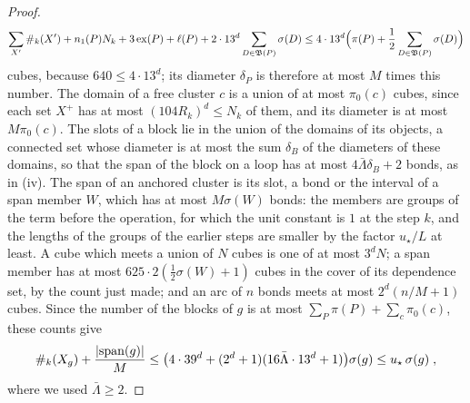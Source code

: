 \documentclass[11pt]{preprint}
\DeclarePairedDelimiter{\abs}{\lvert}{\rvert}
\numberwithin{equation}{section}
\theoremstyle{definition}
\theoremstyle{remark}
\theoremstyle{plain}
\begin{document}
\begin{proof}
\[
    \sum_{X'}\#_k(X') + n_1(P)N_k + 3\operatorname{ex}(P) + \ell(P) + 2 \cdot 13^d\sum_{D \in \mathfrak B(P)}\sigma(D) \leq 4 \cdot 13^d\Bigl(\pi(P) + \frac12\sum_{D \in \mathfrak B(P)}\sigma(D)\Bigr)
\]
cubes, because $640 \leq 4 \cdot 13^d$; its diameter $\delta_P$ is therefore at most $M$ times this number. The domain of a free cluster $c$ is a union of at most $\pi_0(c)$ cubes, since each set $X^+$ has at most $(104R_k)^d \leq N_k$ of them, and its diameter is at most $M\pi_0(c)$. The slots of a block lie in the union of the domains of its objects, a connected set whose diameter is at most the sum $\delta_B$ of the diameters of these domains, so that the span of the block on a loop has at most $4\bar\Lambda\delta_B + 2$ bonds, as in (iv). The span of an anchored cluster is its slot, a bond or the interval of a span member $W$, which has at most $M\sigma(W)$ bonds: the members are groups of the term before the operation, for which the unit constant is $1$ at the step $k$, and the lengths of the groups of the earlier steps are smaller by the factor $u_\star/L$ at least. A cube which meets a union of $N$ cubes is one of at most $3^dN$; a span member has at most $625 \cdot 2(\frac12\sigma(W) + 1)$ cubes in the cover of its dependence set, by the count just made; and an arc of $n$ bonds meets at most $2^d(n/M + 1)$ cubes. Since the number of the blocks of $g$ is at most $\sum_P\pi(P) + \sum_c\pi_0(c)$, these counts give
\[
    \#_k(X_g) + \frac{\abs{\mathrm{span}(g)}}{M} \leq \bigl(4 \cdot 39^d + (2^d + 1)(16\bar\Lambda \cdot 13^d + 1)\bigr)\sigma(g) \leq u_\star\,\sigma(g)\;,
\]
where we used $\bar\Lambda \geq 2$.


\end{proof}
\end{document}
